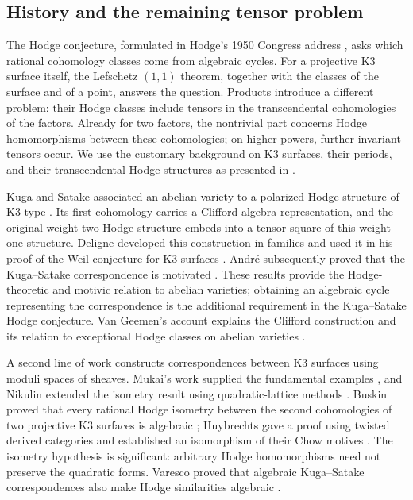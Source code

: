 \subsection{History and the remaining tensor problem}
The Hodge conjecture, formulated in Hodge's 1950 Congress address
\cite{Hodge1952}, asks which rational cohomology classes come from algebraic
cycles.  For a projective K3 surface itself, the Lefschetz $(1,1)$ theorem,
together with the classes of the surface and of a point, answers the question.
Products introduce a different problem: their Hodge classes include tensors
in the transcendental cohomologies of the factors.  Already for two factors,
the nontrivial part concerns Hodge homomorphisms between these cohomologies;
on higher powers, further invariant tensors occur.  We use the customary
background on K3 surfaces, their periods, and their transcendental Hodge
structures as presented in \cite{HuybrechtsK3}.

Kuga and Satake associated an abelian variety to a polarized Hodge structure
of K3 type \cite{KugaSatake}.  Its first cohomology carries a Clifford-algebra
representation, and the original weight-two Hodge structure embeds into a
tensor square of this weight-one structure.  Deligne developed this
construction in families and used it in his proof of the Weil conjecture
for K3 surfaces \cite[Sections~5--6]{DeligneK3}.  Andr\'e subsequently proved
that the Kuga--Satake correspondence is motivated
\cite[Section~7.1]{AndreMotives}.  These results provide the Hodge-theoretic
and motivic relation to abelian varieties; obtaining an algebraic cycle
representing the correspondence is the additional requirement in the
Kuga--Satake Hodge conjecture.  Van Geemen's account explains the Clifford
construction and its relation to exceptional Hodge classes on abelian
varieties \cite{VanGeemenKS}.

A second line of work constructs correspondences between K3 surfaces using
moduli spaces of sheaves.  Mukai's work supplied the fundamental examples
\cite{MukaiBundles}, and Nikulin extended the isometry result using
quadratic-lattice methods \cite{NikulinCorrespondences}.  Buskin proved that every rational Hodge isometry between
the second cohomologies of two projective K3 surfaces is algebraic
\cite[Theorem~1.1]{Buskin}; Huybrechts gave a proof using twisted derived
categories and established an isomorphism of their Chow motives
\cite[Theorems~0.1--0.2]{HuybrechtsIsogenous}.  The isometry hypothesis is
significant: arbitrary Hodge homomorphisms need not preserve the quadratic
forms.  Varesco proved that algebraic Kuga--Satake correspondences also make
Hodge similarities algebraic \cite[Theorem~4.5]{VarescoSimilarities}.

